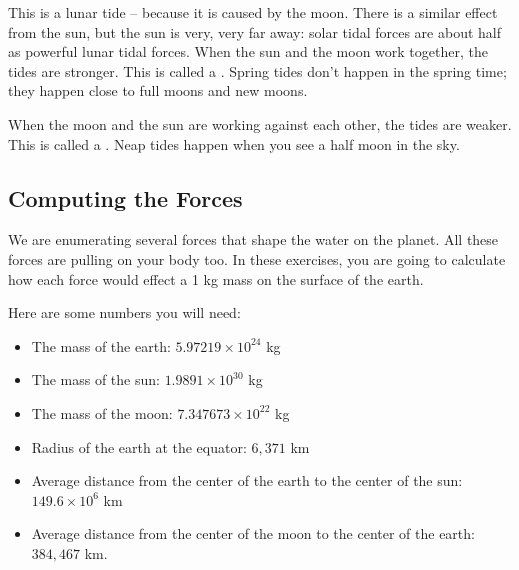 This is a lunar tide -- because it is caused by the moon.  There is a similar effect from the sun,  but the sun is very, very far away: solar tidal forces are about half as powerful lunar tidal forces.  When the sun and the moon work together,   the tides are stronger.  This is called a .   Spring tides don't happen in the spring time;  they happen close to full moons and new moons.

When the moon and the sun are working against each other,  the tides are weaker.  This is called a .  Neap tides happen when you see a half moon in the sky.

\subsection{Computing the Forces}

We are enumerating several forces that shape the water on the planet.  All these forces are pulling on your
body too.  In these exercises, you are going to calculate how each force would effect a 1 kg mass on the surface of the earth.

Here are some numbers you will need:
\begin{itemize}
\item The mass of the earth: $5.97219 \times 10^{24}$ kg
\item The mass of the sun:  $1.9891 \times 10^{30}$ kg
\item The mass of the moon: $7.347673 \times 10^{22}$ kg
\item Radius of the earth at the equator: $6,371$ km
\item Average distance from the center of the earth to the center of the sun:  $149.6 \times 10^6$ km
\item Average distance from the center of the moon to the center of the earth: $384,467$ km.
\end{itemize}


